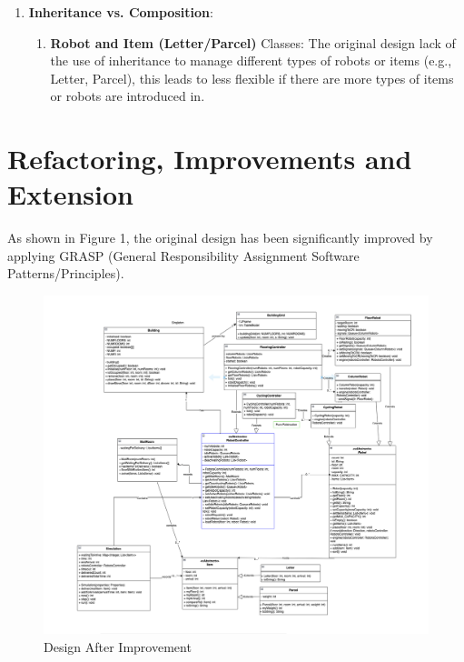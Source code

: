 \documentclass[12pt]{article}
\begin{document}
\begin{enumerate}
\begin{enumerate}
    \end{enumerate}
    \item \textbf{Inheritance vs. Composition}:
    \begin{enumerate}
        \item \textbf{Robot and Item (Letter/Parcel)} Classes: The original design lack of the use of inheritance to manage different types of robots or items (e.g., Letter, Parcel), this leads to less flexible if there are more types of items or robots are introduced in.
    \end{enumerate}
\end{enumerate}

\newpage

\section{Refactoring, Improvements and Extension}
\setlength{\parindent}{2em} As shown in Figure 1, the original design has been significantly improved by applying GRASP (General Responsibility Assignment Software Patterns/Principles).
\begin{figure}[H]
    \centering
    \includegraphics[width=1\linewidth]{Current Design.png}
    \caption{Design After Improvement}
    \label{fig:enter-label}
\end{figure}
\end{document}
